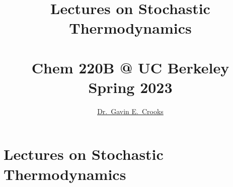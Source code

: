 \documentclass[article,notes]{bespoke6}
\newcommand{\thetitle}{Lectures on Stochastic Thermodynamics}
\newcommand{\theauthor}{Dr.\ Gavin E.\ Crooks}
\newcommand{\self}{_disorder}			%
\begin{document}

\nocite{}


\title{\color{\titlecolor}\thetitle \\ ~  \\ Chem 220B @ UC Berkeley \\ Spring 2023 }
\author{\href{http://threeplusone.com/}{\theauthor}}
\date{}
\maketitle
\thispagestyle{empty}

\tableofcontents
\section{Lectures on Stochastic Thermodynamics}
\end{document}
